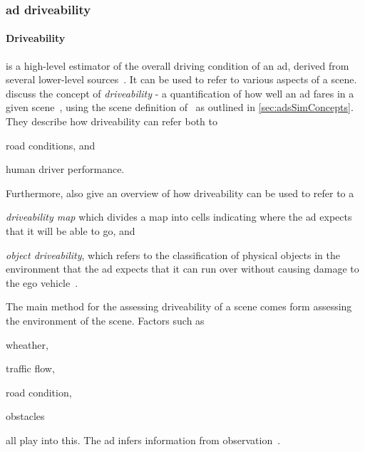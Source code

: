 \subsubsection*{\acrlong{ad} driveability}\label{sec:adsDrivability}

\paragraph{Driveability} is a high-level estimator of the overall driving
condition of an \acrshort{ad}, derived from several lower-level sources~\cite[3140]{safeToDrive}.
It can be used to refer to various aspects of a scene.
\citeauthor{safeToDrive} discuss the concept of \textit{driveability} - a
quantification of how  well an \acrshort{ad} fares in a given
scene~\cite[3135]{safeToDrive}, using the  scene definition
of~\citeauthor{scenes} as outlined in  \cref{sec:adsSimConcepts}. They describe
how driveability can refer both to \begin{inparaenum}
    \item road conditions, and
    \item human driver performance.
\end{inparaenum}


Furthermore, \citeauthor{safeToDrive} also give an overview of how driveability
can be used to refer to a \begin{inparaenum}\setcounter{enumi}{2}
    \item \textit{driveability map} which divides a map into
    cells indicating where the \acrshort{ad} expects that it will be able to go, and
    \item \textit{object driveability}, which refers to the classification of physical
    objects in the environment that the \acrshort{ad} expects that it can run over
    without causing damage to the ego vehicle~\cite[3135-3136]{safeToDrive}.
\end{inparaenum}

The main method for the assessing driveability of a scene comes form assessing the environment
of the scene. Factors such as \begin{inparaenum}
    \item wheather,
    \item traffic flow,
    \item road condition,
    \item obstacles
\end{inparaenum} all play into this. The \acrshort{ad} infers information from
observation~\cite[3136]{safeToDrive}.

